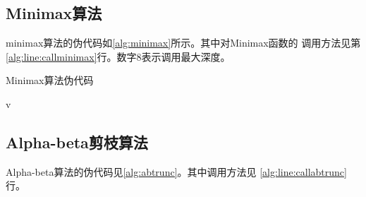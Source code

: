 \documentclass[a4paper]{article}
\begin{document}
\subsection{Minimax算法}
minimax算法的伪代码如\autoref{alg:minimax}所示。其中对Minimax函数的
调用方法见第\ref{alg:line:callminimax}行。数字8表示调用最大深度。
\begin{algorithm}
\caption{Minimax算法伪代码}
\label{alg:minimax}
\begin{algorithmic}[2]
            \State {}
        \EndIf
            \EndFor
        \Else
            \EndFor
        \EndIf
        \State \Return v
    \EndFunction
    \State {}
    \State {}\label{alg:line:callminimax}
\end{algorithmic}
\end{algorithm}

\subsection{Alpha-beta剪枝算法}
Alpha-beta算法的伪代码见\autoref{alg:abtrunc}。其中调用方法见
\ref{alg:line:callabtrunc}行。\\
\end{document}
